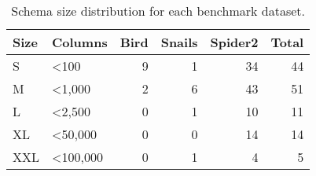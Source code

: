 \begin{table}
\caption{Schema size distribution for each benchmark dataset.}
\label{tab:benchmark-schema-sizes}
\begin{tabular}{llrrrr}
\toprule
Size & Columns & Bird & Snails & Spider2 & Total \\
\midrule
S & <100 & 9 & 1 & 34 & 44 \\
M & <1,000 & 2 & 6 & 43 & 51 \\
L & <2,500 & 0 & 1 & 10 & 11 \\
XL & <50,000 & 0 & 0 & 14 & 14 \\
XXL & <100,000 & 0 & 1 & 4 & 5 \\
\bottomrule
\end{tabular}
\end{table}
